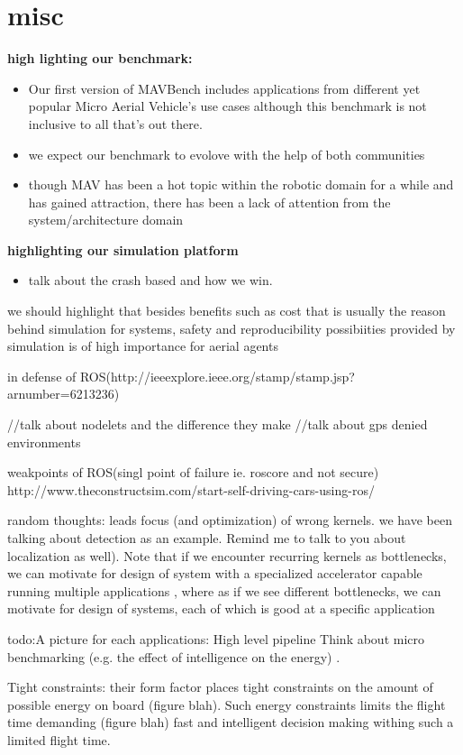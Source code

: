    \section{misc}
   
   \textbf{high lighting our benchmark:}  
   \begin{itemize}
   \item Our first version of MAVBench includes applications from different yet popular Micro Aerial Vehicle’s use cases although this benchmark is not inclusive to all that's out there. 
   
   \item we expect our benchmark to evolove with the help of both communities
   \item though MAV has been a hot topic within the robotic domain for a while and has gained attraction, there has been a lack of attention from the system/architecture domain
   
   
   \end{itemize}
   
   \textbf{highlighting our simulation platform}
   \begin{itemize}
   \item talk about the crash based and how we win.
   \end{itemize}
   
   we should highlight that besides benefits such as cost that is usually the reason behind simulation for systems, safety and reproducibility possibiities provided by simulation is of high importance for aerial agents
   
   in defense of ROS(http://ieeexplore.ieee.org/stamp/stamp.jsp?arnumber=6213236) 
   
    //talk about nodelets and the difference they make 
   //talk about gps denied environments
   
   weakpoints of ROS(singl point of failure ie. roscore and not secure) http://www.theconstructsim.com/start-self-driving-cars-using-ros/
  
  
  random thoughts: leads focus (and optimization) of wrong kernels. we have been talking about detection as an example. Remind me to talk to you about localization as well). Note that if we encounter recurring kernels as bottlenecks, we can motivate for design of system with a specialized accelerator capable running multiple applications ,  where as if we see different bottlenecks, we can motivate for design of systems, each of which is good at a specific application
    
    todo:A picture for each applications:
High level pipeline
Think about micro benchmarking (e.g. the effect of intelligence on the energy)
. 

Tight constraints: their form factor places tight constraints on the amount of possible energy on board (figure blah). Such energy constraints limits the flight time demanding (figure blah) fast and intelligent decision making withing such a limited flight time.
